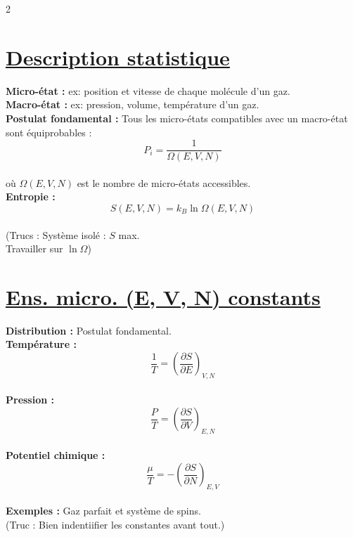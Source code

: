 \documentclass[11pt]{article}
\begin{document}
\begin{multicols}{2}

\section{\underline{Description statistique}}
\textbf{Micro-état :} ex: position et vitesse de chaque molécule d'un gaz.\\
\textbf{Macro-état :} ex: pression, volume, température d'un gaz.\\
\textbf{Postulat fondamental :} Tous les micro-états compatibles avec un macro-état sont équiprobables :
\begin{equation*}
  P_i = \frac{1}{\Omega (E, V, N)}
\end{equation*}\\
où $\Omega (E, V, N)$ est le nombre de micro-états accessibles.\\
\textbf{Entropie :}
\begin{equation*}
  \boxed{S(E, V, N) = k_B \ln \Omega (E, V, N)}
\end{equation*}\\
(Trucs : Système isolé : $S$ max.\\
Travailler sur $\ln\Omega$)\\

\section{\underline{Ens. micro. (E, V, N) constants}}
\textbf{Distribution :} Postulat fondamental.\\
\textbf{Température :}
\begin{equation*}
  \frac{1}{T} = \left( \frac{\partial S}{\partial E} \right)_{V, N}
\end{equation*}\\
\textbf{Pression :}
\begin{equation*}
  \frac{P}{T} = \left( \frac{\partial S}{\partial V} \right)_{E, N}
\end{equation*}\\
\textbf{Potentiel chimique :}
\begin{equation*}
  \frac{\mu}{T} = -\left( \frac{\partial S}{\partial N} \right)_{E, V}
\end{equation*}\\
\textbf{Exemples :} Gaz parfait et système de spins.\\
(Truc : Bien indentiifier les constantes avant tout.)\\


\end{multicols}
\end{document}
